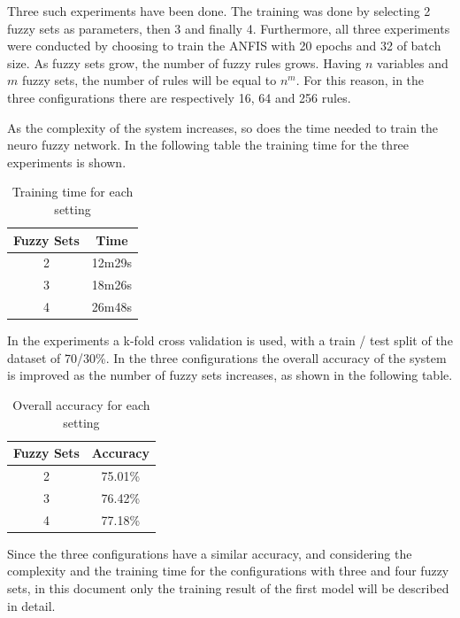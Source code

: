 \documentclass[10pt,twocolumn,letterpaper]{article}
\begin{document}
Three such experiments have been done. The training was done by selecting 2 fuzzy sets as parameters, then 3 and finally 4. Furthermore, all three experiments were conducted by choosing to train the ANFIS with 20 epochs and 32 of batch size.
As fuzzy sets grow, the number of fuzzy rules grows. Having $n$ variables and $m$ fuzzy sets, the number of rules will be equal to $n^{m}$. For this reason, in the three configurations there are respectively 16, 64 and 256 rules.

As the complexity of the system increases, so does the time needed to train the neuro fuzzy network. In the following table the training time for the three experiments is shown.

\begin{table}[h!]
\centering
\begin{tabular}{||c c||} 
 \hline
 Fuzzy Sets & Time \\ [0.5ex] 
 \hline\hline
 2 & 12m29s \\ 
 3 & 18m26s \\
 4 & 26m48s \\  [1ex] 
 \hline
\end{tabular}
\caption{Training time for each setting}
\label{table:2}
\end{table}

In the experiments a k-fold cross validation is used, with a train / test split of the dataset of 70/30\%. In the three configurations the overall accuracy of the system is improved as the number of fuzzy sets increases, as shown in the following table. 
\begin{table}[h!]
\centering
\begin{tabular}{||c c||} 
 \hline
 Fuzzy Sets & Accuracy \\ [0.5ex] 
 \hline\hline
 2 & 75.01\% \\ 
 3 & 76.42\% \\
 4 & 77.18\% \\  [1ex] 
 \hline
\end{tabular}
\caption{Overall accuracy for each setting}
\label{table:2}
\end{table}

Since the three configurations have a similar accuracy, and considering the complexity and the training time for the configurations with three and four fuzzy sets, in this document only the training result of the first model will be described in detail.
\end{document}
